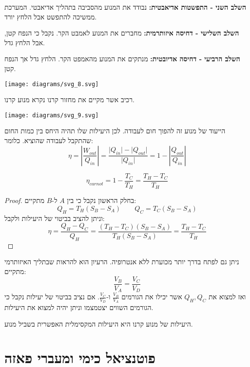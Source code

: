\documentclass{tstextbook}
\begin{document}
\textbf{השלב השני - התפשטות אדיאבטית:}
נבודד את המנוע מהסביבה בתהליך אדיאבטי. המערכת ממשיכה להתפשט אבל הלחץ יורד.

\textbf{השלב השלישי - דחיסה איזותרמית:}
מחברים את המנוע לאמבט הקר. נקבל כי הנפח קטן, אבל הלחץ גדל.

\textbf{השלב הרביעי - דחיסה אדיובטית:}
מנתקים את המנוע מהאמפט הקר. הלחץ גדל אך הנפח קטן.

\texttt{[image: diagrams/svg\_8.svg]}
\begin{definition}
רכיב אשר מקיים את מחזור קרנו נקרא מנוע קרנו.

\end{definition}
\texttt{[image: diagrams/svg\_9.svg]}
\begin{definition}[יעילות]
הייעוד של מנוע זה להפוך חום לעבודה. לכן היעילות שלו תהיה היחס בין כמות החום שהתקבל לעבודה שהוציא. כלומר:
$$\eta = \left\lvert  \frac{W_{out}}{Q_{in}}  \right\rvert = \frac{\lvert Q_{in} \rvert -\lvert Q_{out} \rvert}{\lvert Q_{in} \rvert }=1-\left\lvert  \frac{Q_{out}}{Q_{in}}  \right\rvert  $$

\end{definition}
\begin{proposition}
$$\eta_{carnot}=1-\frac{T_{C}}{T_{H}}=\frac{T_{H}-T_{C}}{T_{H}}$$

\end{proposition}
\begin{proof}
בחלק הראשון נקבל כי בין \(A\) ל-\(B\) מתקיים:
$$Q_{H}=T_{H}(S_{B}-S_{A}) \qquad Q_{C}=T_{C}(S_{B}-S_{A})$$
וניתן להציב בביטוי של היעילות ולקבל:
$$\eta = \frac{Q_{H} - Q_{C}}{Q_{H}}= \frac{(T_{H}-T_{C})(S_{B}-S_{A})}{T_{H}(S_{B}-S_{A})}=\frac{T_{H}-T_{C}}{T_{H}}$$

\end{proof}
\begin{remark}
ניתן גם לפתח בדרך יותר מכוערת ללא אנטרופיה. הרעיון הוא להראות שבתליך האיזותרמי מתקיים:
$$\frac{V_{B}}{V_{A}}=\frac{V_{C}}{V_{D}}$$
ואז למצוא את \(Q_{H},Q_{C}\) אשר יכילו את הגורמים \(\frac{V_{B}}{V_{A}}\) ו-\(\frac{V_{C}}{V_{D}}\). אם נציב בביטוי של יעילות נקבל כי הגורמים השווים יצטמצמו וניתן יהיה למצוא את היעילות.

\end{remark}
\begin{theorem}
היעילות של מנוע קרנו היא היעילות המקסימלית האפשרית בשביל מנוע.

\end{theorem}
\section{פוטנציאל כימי ומעברי פאזה}
\end{document}
